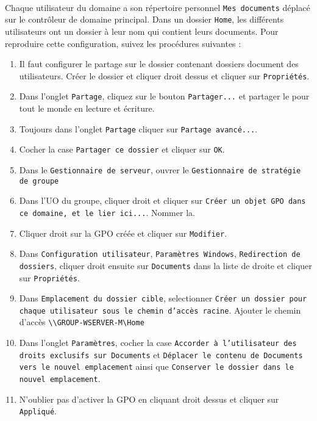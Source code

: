 			\paragraph{}
				Chaque utilisateur du domaine a son répertoire personnel \texttt{Mes documents} déplacé sur le contrôleur de domaine principal. Dans un dossier \texttt{Home}, les différents utilisateurs ont un dossier à leur nom qui contient leurs documents. Pour reproduire cette configuration, suivez les procédures suivantes :
				\begin{enumerate}
					\item Il faut configurer le partage sur le dossier contenant dossiers document des utilisateurs. Créer le dossier et cliquer droit dessus et cliquer sur \texttt{Propriétés}.
					\item Dans l'onglet \texttt{Partage}, cliquez sur le bouton \texttt{Partager...} et partager le pour tout le monde en lecture et écriture.
					\item Toujours dans l'onglet \texttt{Partage} cliquer sur \texttt{Partage avancé...}.
					\item Cocher la case \texttt{Partager ce dossier} et cliquer sur \texttt{OK}.
					\item Dans le \texttt{Gestionnaire de serveur}, ouvrer le \texttt{Gestionnaire de stratégie de groupe}
					\item Dans l'UO du groupe, cliquer droit et cliquer sur \texttt{Créer un objet GPO dans ce domaine, et le lier ici...}. Nommer la. 
					\item Cliquer droit sur la GPO créée et cliquer sur \texttt{Modifier}.
					\item Dans \texttt{Configuration utilisateur}, \texttt{Paramètres Windows}, \texttt{Redirection de dossiers}, cliquer droit ensuite sur \texttt{Documents} dans la liste de droite et cliquer sur \texttt{Propriétés}. 
					\item Dans \texttt{Emplacement du dossier cible}, selectionner \texttt{Créer un dossier pour chaque utilisateur sous le chemin d'accès racine}. Ajouter le chemin d'accès \texttt{\textbackslash{}\textbackslash{}GROUP-WSERVER-M\textbackslash{}Home}
					\item Dans l'onglet \texttt{Paramètres}, cocher la case \texttt{Accorder à l'utilisateur des droits exclusifs sur Documents} et \texttt{Déplacer le contenu de Documents vers le nouvel emplacement} ainsi que \texttt{Conserver le dossier dans le nouvel emplacement}.
					\item N'oublier pas d'activer la GPO en cliquant droit dessus et cliquer sur \texttt{Appliqué}.
				\end{enumerate}

